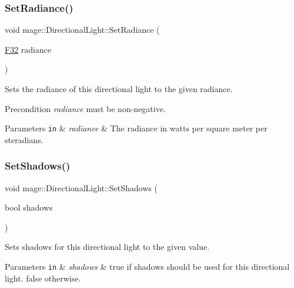 \subsubsection{\texorpdfstring{Set\+Radiance()}{SetRadiance()}}
{\footnotesize\ttfamily void mage\+::\+Directional\+Light\+::\+Set\+Radiance (\begin{DoxyParamCaption}\item[{\hyperlink{namespacemage_aa97e833b45f06d60a0a9c4fc22ae02c0}{F32}}]{radiance }\end{DoxyParamCaption})\hspace{0.3cm}{\ttfamily [noexcept]}}

Sets the radiance of this directional light to the given radiance.

\begin{DoxyPrecond}{Precondition}
{\itshape radiance} must be non-\/negative. 
\end{DoxyPrecond}

\begin{DoxyParams}[1]{Parameters}
\mbox{\tt in}  & {\em radiance} & The radiance in watts per square meter per steradians. \\
\hline
\end{DoxyParams}
\hypertarget{classmage_1_1_directional_light_ab70b4298dc6616dbe22446e8e3298424}{}\label{classmage_1_1_directional_light_ab70b4298dc6616dbe22446e8e3298424} 
\subsubsection{\texorpdfstring{Set\+Shadows()}{SetShadows()}}
{\footnotesize\ttfamily void mage\+::\+Directional\+Light\+::\+Set\+Shadows (\begin{DoxyParamCaption}\item[{bool}]{shadows }\end{DoxyParamCaption})\hspace{0.3cm}{\ttfamily [noexcept]}}

Sets shadows for this directional light to the given value.


\begin{DoxyParams}[1]{Parameters}
\mbox{\tt in}  & {\em shadows} & {\ttfamily true} if shadows should be used for this directional light. {\ttfamily false} otherwise. \\
\hline
\end{DoxyParams}
\hypertarget{classmage_1_1_directional_light_a1c15d8e42526ed5ae7568cff5c7b25e0}{}\label{classmage_1_1_directional_light_a1c15d8e42526ed5ae7568cff5c7b25e0} 
